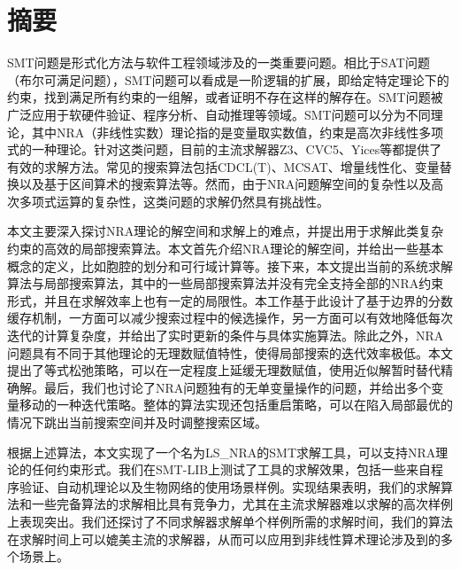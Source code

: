 \maketitle%
\MAKETITLE%
\makedeclaration%
\intobmk\chapter*{摘\quad 要}%
\setcounter{page}{1}%

SMT问题是形式化方法与软件工程领域涉及的一类重要问题。相比于SAT问题（布尔可满足问题），SMT问题可以看成是一阶逻辑的扩展，即给定特定理论下的约束，找到满足所有约束的一组解，或者证明不存在这样的解存在。SMT问题被广泛应用于软硬件验证、程序分析、自动推理等领域。SMT问题可以分为不同理论，其中NRA（非线性实数）理论指的是变量取实数值，约束是高次非线性多项式的一种理论。针对这类问题，目前的主流求解器Z3、CVC5、Yices等都提供了有效的求解方法。常见的搜索算法包括CDCL(T)、MCSAT、增量线性化、变量替换以及基于区间算术的搜索算法等。然而，由于NRA问题解空间的复杂性以及高次多项式运算的复杂性，这类问题的求解仍然具有挑战性。

本文主要深入探讨NRA理论的解空间和求解上的难点，并提出用于求解此类复杂约束的高效的局部搜索算法。本文首先介绍NRA理论的解空间，并给出一些基本概念的定义，比如胞腔的划分和可行域计算等。接下来，本文提出当前的系统求解算法与局部搜索算法，其中的一些局部搜索算法并没有完全支持全部的NRA约束形式，并且在求解效率上也有一定的局限性。本工作基于此设计了基于边界的分数缓存机制，一方面可以减少搜索过程中的候选操作，另一方面可以有效地降低每次迭代的计算复杂度，并给出了实时更新的条件与具体实施算法。除此之外，NRA问题具有不同于其他理论的无理数赋值特性，使得局部搜索的迭代效率极低。本文提出了等式松弛策略，可以在一定程度上延缓无理数赋值，使用近似解暂时替代精确解。最后，我们也讨论了NRA问题独有的无单变量操作的问题，并给出多个变量移动的一种迭代策略。整体的算法实现还包括重启策略，可以在陷入局部最优的情况下跳出当前搜索空间并及时调整搜索区域。

根据上述算法，本文实现了一个名为LS\_NRA的SMT求解工具，可以支持NRA理论的任何约束形式。我们在SMT-LIB上测试了工具的求解效果，包括一些来自程序验证、自动机理论以及生物网络的使用场景样例。实现结果表明，我们的求解算法和一些完备算法的求解相比具有竞争力，尤其在主流求解器难以求解的高次样例上表现突出。我们还探讨了不同求解器求解单个样例所需的求解时间，我们的算法在求解时间上可以媲美主流的求解器，从而可以应用到非线性算术理论涉及到的多个场景上。


